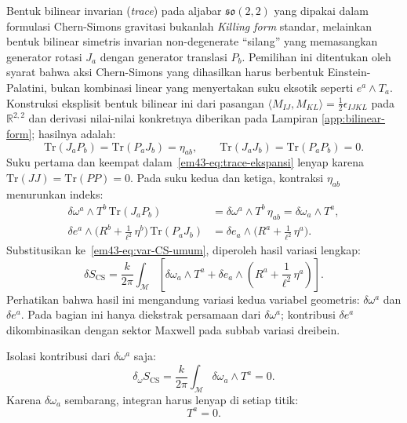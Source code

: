 Bentuk bilinear invarian (\textit{trace}) pada aljabar $\mathfrak{so}(2,2)$ yang dipakai dalam formulasi Chern-Simons gravitasi bukanlah \textit{Killing form} standar, melainkan bentuk bilinear simetris invarian non-degenerate ``silang'' yang memasangkan generator rotasi $J_a$ dengan generator translasi $P_b$. Pemilihan ini ditentukan oleh syarat bahwa aksi Chern-Simons yang dihasilkan harus berbentuk Einstein-Palatini, bukan kombinasi linear yang menyertakan suku eksotik seperti $e^a \wedge T_a$. Konstruksi eksplisit bentuk bilinear ini dari pasangan $\langle M_{IJ}, M_{KL}\rangle = \tfrac{1}{2}\epsilon_{IJKL}$ pada $\mathbb{R}^{2,2}$ dan derivasi nilai-nilai konkretnya diberikan pada Lampiran \ref{app:bilinear-form}; hasilnya adalah:
\begin{equation}\label{em43-eq:trace-rel}
    \mathrm{Tr}(J_{a} P_{b}) = \mathrm{Tr}(P_{a} J_{b}) = \eta_{ab},
    \qquad
    \mathrm{Tr}(J_{a} J_{b}) = \mathrm{Tr}(P_{a} P_{b}) = 0.
\end{equation}
Suku pertama dan keempat dalam~\eqref{em43-eq:trace-ekspansi} lenyap karena $\mathrm{Tr}(JJ) = \mathrm{Tr}(PP) = 0$. Pada suku kedua dan ketiga, kontraksi $\eta_{ab}$ menurunkan indeks:
\begin{align}
    \delta\omega^{a} \wedge T^{b}\, \mathrm{Tr}(J_{a} P_{b})
    &= \delta\omega^{a} \wedge T^{b}\, \eta_{ab}
    = \delta\omega_{a} \wedge T^{a}, \nonumber \\[4pt]
    \delta e^{a} \wedge \big(R^{b}
    + \tfrac{1}{\ell^{2}}\,\eta^{b}\big)\, \mathrm{Tr}(P_{a} J_{b})
    &= \delta e_{a} \wedge \big(R^{a}
    + \tfrac{1}{\ell^{2}}\,\eta^{a}\big).
\end{align}
Substitusikan ke~\eqref{em43-eq:var-CS-umum}, diperoleh hasil variasi lengkap:
\begin{equation}\label{em43-eq:var-CS-final}
    \delta S_{\mathrm{CS}}
    = \frac{k}{2\pi} \int_{\mathcal{M}}
    \left[\delta\omega_{a} \wedge T^{a}
    + \delta e_{a} \wedge \left(R^{a}
    + \frac{1}{\ell^{2}}\, \eta^{a}\right)\right].
\end{equation}
Perhatikan bahwa hasil ini mengandung variasi kedua variabel geometris: $\delta\omega^{a}$ dan $\delta e^{a}$. Pada bagian ini hanya diekstrak persamaan dari $\delta\omega^{a}$; kontribusi $\delta e^{a}$ dikombinasikan dengan sektor Maxwell pada subbab variasi dreibein.

Isolasi kontribusi dari $\delta\omega^{a}$ saja:
\begin{equation}\label{em43-eq:var-omega-only}
    \delta_{\omega} S_{\mathrm{CS}}
    = \frac{k}{2\pi} \int_{\mathcal{M}}
    \delta\omega_{a} \wedge T^{a} = 0.
\end{equation}
Karena $\delta\omega_{a}$ sembarang, integran harus lenyap di setiap titik:
\begin{equation}\label{em43-eq:eq-torsion}
    T^{a} = 0.
\end{equation}

